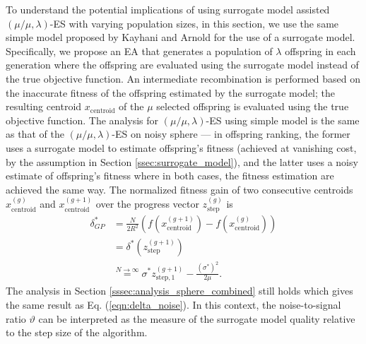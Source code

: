 To understand the potential implications of using surrogate model assisted $(\mu/\mu,\lambda)$-ES with varying population sizes, in this section, we use the same simple model proposed by Kayhani and Arnold \cite{DBLP:conf/ppsn/KayhaniA18} for the use of a surrogate model. Specifically, we propose an EA that generates a population of $\lambda$ offspring in each generation where the offspring are evaluated using the surrogate model instead of the true objective function. An intermediate recombination is performed based on the inaccurate fitness of the offspring estimated by the surrogate model; the resulting centroid $x_{\text{centroid}}$ of the $\mu$ selected offspring is evaluated using the true objective function. The analysis for $(\mu/\mu,\lambda)$-ES using simple model is the same as that of the $(\mu/\mu,\lambda)$-ES on noisy sphere --- in offspring ranking, the former uses a surrogate model to estimate offspring's fitness (achieved at vanishing cost, by the assumption in Section \ref{ssec:surrogate_model}), and the latter uses a noisy estimate of offspring's fitness where in both cases, the fitness estimation are achieved the same way. The normalized fitness gain of two consecutive centroids $x_{\text{centroid}}^{(g)}$ and $x_{\text{centroid}}^{(g+1)}$ over the progress vector $z_{\text{step}}^{(g)}$ is 
\begin{align}
\delta_{GP}^* &=  \frac{N}{2R^2}\left( f( x_{\text{centroid}}^{(g+1)} ) - f( x_{\text{centroid}}^{(g)} ) \right)  \nonumber\\ 
& = \delta^*(z_{\text{step}}^{(g+1)}) \nonumber\\ 
&\overset{N \rightarrow \infty}{=} \sigma^* z_{\text{step},1}^{(g+1)}   - \frac{(\sigma^*)^2}{2 \mu}. \label{eqn:delta_surrogate}{}
\end{align}
The analysis in Section \ref{sssec:analysis_sphere_combined} still holds which gives the same result as Eq. (\ref{eqn:delta_noise}). In this context, the noise-to-signal ratio $\vartheta$ can be interpreted as the measure of the surrogate model quality relative to the step size of the algorithm. 

